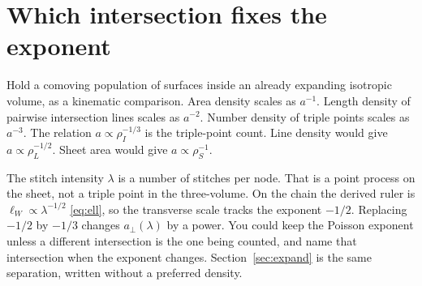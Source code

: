 \section{Which intersection fixes the exponent}
\label{sec:h-rhoi}

Hold a comoving population of surfaces inside an already expanding
isotropic volume, as a kinematic comparison.
Area density scales as \(a^{-1}\).
Length density of pairwise intersection lines scales as \(a^{-2}\).
Number density of triple points scales as \(a^{-3}\).
The relation \(a\propto\rho_I^{-1/3}\) is the triple-point count.
Line density would give \(a\propto\rho_L^{-1/2}\).
Sheet area would give \(a\propto\rho_S^{-1}\).

The stitch intensity \(\lambda\) is a number of stitches per node.
That is a point process on the sheet, not a triple point in the
three-volume.
On the chain the derived ruler is \(\ell_W\propto\lambda^{-1/2}\)
\eqref{eq:ell}, so the transverse scale tracks the exponent \(-1/2\).
Replacing \(-1/2\) by \(-1/3\) changes \(a_\perp(\lambda)\) by a power.
You could keep the Poisson exponent unless a different intersection is
the one being counted, and name that intersection when the exponent
changes.
Section~\ref{sec:expand} is the same separation, written without a
preferred density.
